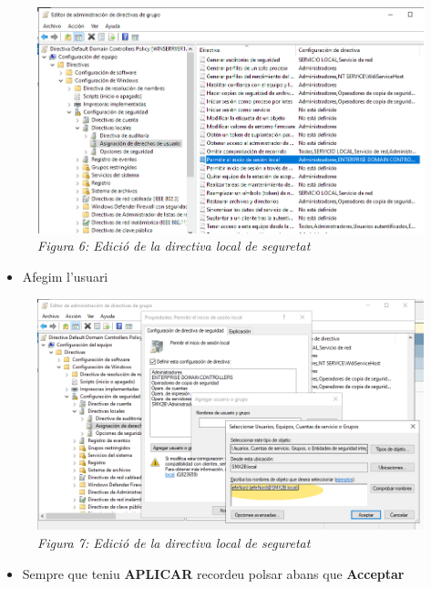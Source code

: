 \documentclass[
  a4paper,
]{article}
\providecommand{\tightlist}{%
  \setlength{\itemsep}{0pt}\setlength{\parskip}{0pt}}
\begin{document}
\begin{figure}
\centering
\includegraphics{png/EditarDirectiva2.png}
\caption{\emph{Figura 6: Edició de la directiva local de seguretat}}
\end{figure}

\begin{itemize}
\tightlist
\item
  Afegim l'usuari
\end{itemize}

\begin{figure}
\centering
\includegraphics{png/EditarDirectiva3.png}
\caption{\emph{Figura 7: Edició de la directiva local de seguretat}}
\end{figure}

\begin{itemize}
\tightlist
\item
  Sempre que teniu \textbf{APLICAR} recordeu polsar abans que
  \textbf{Acceptar}
\end{itemize}
\end{document}
